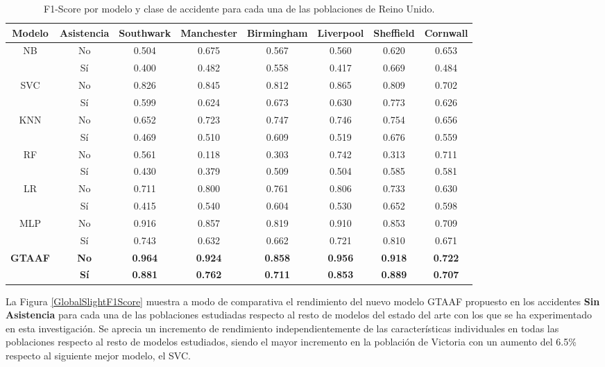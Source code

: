 \documentclass{uathesis-es}
\begin{document}
{\begin{table}[H]
\begin{center}
\begin{tabular}{|c|c||c|c|c|c|c|c|}
					\textbf{Modelo} & \textbf{Asistencia} & Southwark & Manchester & Birmingham & Liverpool & Sheffield & Cornwall
					\\ \hline \hline
					
					\multirow{2}{*}{NB} &
					No & 0.504 & 0.675 &  0.567 & 0.560 & 0.620 & 0.653 \\ &
					Sí & 0.400 & 0.482 & 0.558 & 0.417 & 0.669 & 0.484 \\ \hline \hline
					\multirow{2}{*}{SVC} &
					No & 0.826 & 0.845 & 0.812 & 0.865 & 0.809 & 0.702 \\ &
					Sí & 0.599 & 0.624 & 0.673 & 0.630 & 0.773 & 0.626 \\ \hline \hline
					\multirow{2}{*}{KNN} &
					No  & 0.652 & 0.723 & 0.747 & 0.746 & 0.754 & 0.656 \\ &
					Sí & 0.469 & 0.510 & 0.609 & 0.519 & 0.676 & 0.559 \\ \hline \hline
					\multirow{2}{*}{RF} &
					No & 0.561  & 0.118 & 0.303 & 0.742 & 0.313 & 0.711 \\ &
					Sí & 0.430 & 0.379 & 0.509 & 0.504 & 0.585 & 0.581 \\ \hline \hline
					\multirow{2}{*}{LR} &
					No & 0.711 & 0.800 & 0.761 & 0.806 & 0.733 & 0.630 \\ &
					Sí & 0.415 & 0.540 & 0.604 & 0.530 & 0.652 & 0.598 \\ \hline \hline
					\multirow{2}{*}{MLP} &
					No & 0.916 &  0.857 & 0.819 & 0.910 & 0.853 & 0.709 \\ &
					Sí & 0.743 & 0.632 & 0.662 & 0.721 & 0.810 & 0.671 \\ \hline \hline
					\multirow{2}{*}{\textbf     {GTAAF}} &
					\textbf{No} & \textbf{0.964} & \textbf{0.924} & \textbf{0.858} & \textbf{0.956} & \textbf{0.918} & \textbf{0.722} \\ &
					\textbf{Sí} & \textbf{0.881} & \textbf{0.762} & \textbf{0.711} & \textbf{0.853} & \textbf{0.889} & \textbf{0.707} \\ \hline \hline
				\end{tabular}
			\end{center}
			\caption{F1-Score por modelo y clase de accidente para cada una de las poblaciones de Reino Unido.}
			\label{UKMetrics}
		\end{table}
		
		
		La Figura \ref{GlobalSlightF1Score} muestra a modo de comparativa el rendimiento del nuevo modelo GTAAF propuesto en los accidentes \textbf{Sin Asistencia} para cada una de las poblaciones estudiadas respecto al resto de modelos del estado del arte con los que se ha experimentado en esta investigación. Se aprecia un incremento de rendimiento independientemente de las características individuales en todas las poblaciones respecto al resto de modelos estudiados, siendo el mayor incremento en la población de Victoria con un aumento del 6.5\% respecto al siguiente mejor modelo, el SVC.
		
}
\end{document}
